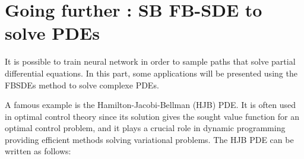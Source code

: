 \documentclass{article}
\begin{document}
\section{Going further : SB FB-SDE to solve PDEs}
It is possible to train neural network in order to sample paths that solve partial differential equations. In this part, some applications will be presented using the FBSDEs method to solve complexe PDEs.


A famous example is the Hamilton-Jacobi-Bellman (HJB) PDE. It is often used in optimal control theory since its solution gives the sought value function for an optimal control problem, and it plays a crucial role in dynamic programming providing efficient methods solving variational problems. The HJB PDE can be written as follows:
\end{document}
